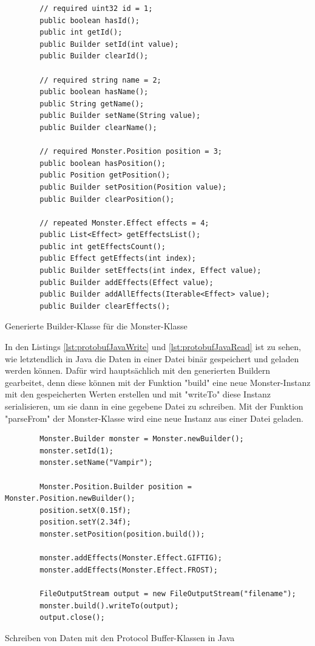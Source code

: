 \begin{listing}[htp]
    \begin{verbatim} 
        // required uint32 id = 1;
        public boolean hasId();
        public int getId();
        public Builder setId(int value);
        public Builder clearId();

        // required string name = 2;
        public boolean hasName();
        public String getName();
        public Builder setName(String value);
        public Builder clearName();

        // required Monster.Position position = 3;
        public boolean hasPosition();
        public Position getPosition();
        public Builder setPosition(Position value);
        public Builder clearPosition();

        // repeated Monster.Effect effects = 4;
        public List<Effect> getEffectsList();
        public int getEffectsCount();
        public Effect getEffects(int index);
        public Builder setEffects(int index, Effect value);
        public Builder addEffects(Effect value);
        public Builder addAllEffects(Iterable<Effect> value);
        public Builder clearEffects();
    \end{verbatim}
    \caption{Generierte Builder-Klasse für die Monster-Klasse}
    \label{lst:protoJavaGeneratedBuilder}
\end{listing}

In den Listings \ref{lst:protobufJavaWrite} und \ref{lst:protobufJavaRead} ist zu sehen, wie letztendlich in Java die Daten in einer Datei binär gespeichert und geladen werden können. Dafür wird hauptsächlich mit den generierten Buildern gearbeitet, denn diese können mit der Funktion "build" eine neue Monster-Instanz mit den gespeicherten Werten erstellen und mit "writeTo" diese Instanz serialisieren, um sie dann in eine gegebene Datei zu schreiben. Mit der Funktion "parseFrom" der Monster-Klasse wird eine neue Instanz aus einer Datei geladen. 

\begin{listing}[htp]
    \begin{verbatim} 
        Monster.Builder monster = Monster.newBuilder();
        monster.setId(1);
        monster.setName("Vampir");

        Monster.Position.Builder position = Monster.Position.newBuilder();
        position.setX(0.15f);
        position.setY(2.34f);
        monster.setPosition(position.build());

        monster.addEffects(Monster.Effect.GIFTIG);
        monster.addEffects(Monster.Effect.FROST);

        FileOutputStream output = new FileOutputStream("filename");
        monster.build().writeTo(output);
        output.close();
    \end{verbatim}
    \caption{Schreiben von Daten mit den Protocol Buffer-Klassen in Java}
    \label{lst:protobufJavaWrite}
\end{listing}

